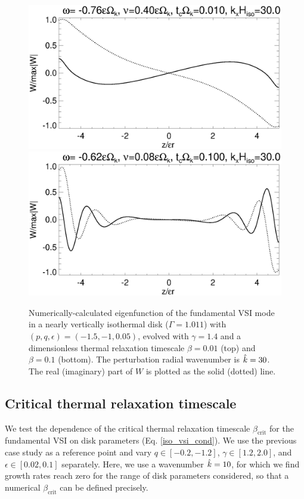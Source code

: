 \begin{figure}
  \includegraphics[width=\linewidth,clip=true,trim=0cm 1.75cm 0cm
  0cm]{figures/eigenvectorW_beta0d01} 
  \includegraphics[width=\linewidth,clip=true,trim=0cm 0cm 0cm
  0cm]{figures/eigenvectorW_beta0d1} 
  \caption{Numerically-calculated eigenfunction of the fundamental VSI
    mode in a nearly vertically isothermal disk ($\Gamma=1.011$) with
    $(p,q,\epsilon)=(-1.5,-1,0.05)$, evolved with $\gamma=1.4$ and a dimensionless 
    thermal relaxation timescale $\beta = 0.01$
    (top) and $\beta=0.1$ (bottom). The
    perturbation radial wavenumber is $\hat{k}=30$. The
    real (imaginary) part of $W$ is plotted as the solid (dotted)
    line.
    \label{relax_eigenW_num}}  
\end{figure}

\subsection{Critical thermal relaxation timescale}
We test the dependence of the critical thermal relaxation timescale 
$\beta_\mathrm{crit}$ for the fundamental VSI on disk parameters
(Eq. \ref{iso_vsi_cond}).  We use the previous case study as a
reference point and vary $q\in[-0.2,-1.2]$, 
$\gamma\in[1.2,2.0]$, and $\epsilon\in[0.02,0.1]$
separately. Here, we use a wavenumber $\hat{k}=10$, for which we
find growth rates reach zero for the range of disk parameters
considered, so that a numerical $\beta_\mathrm{crit}$ can be defined precisely. 


